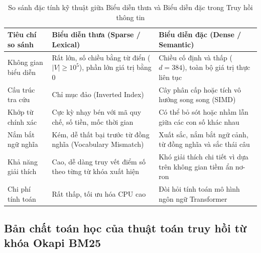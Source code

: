 \begin{table}[!htbp]
\centering
\small
\caption{So sánh đặc tính kỹ thuật giữa Biểu diễn thưa và Biểu diễn đặc trong Truy hồi thông tin}
\label{tab:sparse_vs_dense_comparison}
\begin{tabularx}{\textwidth}{L{3.2cm} X X}
\toprule
\textbf{Tiêu chí so sánh} & \textbf{Biểu diễn thưa (Sparse / Lexical)} & \textbf{Biểu diễn đặc (Dense / Semantic)} \\
\midrule
Không gian biểu diễn & Rất lớn, số chiều bằng từ điển ($|V| \ge 10^5$), phần lớn giá trị bằng 0 & Chiều cố định và thấp ($d = 384$), toàn bộ giá trị thực liên tục \\
Cấu trúc tra cứu & Chỉ mục đảo (Inverted Index) & Cây phân cấp hoặc tích vô hướng song song (SIMD) \\
Khớp từ chính xác & Cực kỳ nhạy bén với mã quy chế, số tiền, mốc thời gian & Có thể bỏ sót hoặc nhầm lẫn giữa các con số khác nhau \\
Nắm bắt ngữ nghĩa & Kém, dễ thất bại trước từ đồng nghĩa (Vocabulary Mismatch) & Xuất sắc, nắm bắt ngữ cảnh, từ đồng nghĩa và sắc thái câu \\
Khả năng giải thích & Cao, dễ dàng truy vết điểm số theo từng từ khóa xuất hiện & Khó giải thích chi tiết vì dựa trên không gian tiềm ẩn nơ-ron \\
Chi phí tính toán & Rất thấp, tối ưu hóa CPU cao & Đòi hỏi tính toán mô hình ngôn ngữ Transformer \\
\bottomrule
\end{tabularx}
\end{table}

\subsection{Bản chất toán học của thuật toán truy hồi từ khóa Okapi BM25}

